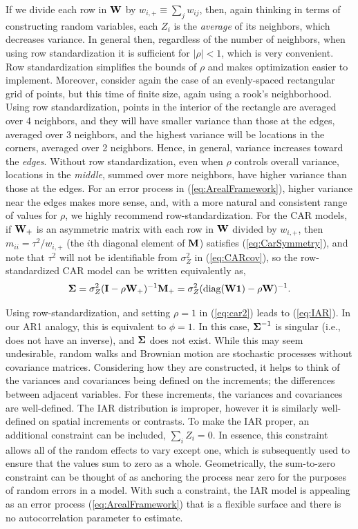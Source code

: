\documentclass[11pt, titlepage]{article}\usepackage[]{graphicx}\usepackage[]{color}
\begin{document}
If we divide each row in $\mathbf{W}$ by $w_{i,+} \equiv \sum_j w_{ij}$, then, again thinking in terms of constructing random variables, each $Z_i$ is the \textit{average} of its neighbors, which decreases variance. In general then, regardless of the number of neighbors, when using row standardization it is sufficient for $|\rho| < 1$, which is very convenient. Row standardization simplifies the bounds of $\rho$ and makes optimization easier to implement.  Moreover, consider again the case of an evenly-spaced rectangular grid of points, but this time of finite size, again using a rook's neighborhood.  Using row standardization, points in the interior of the rectangle are averaged over 4 neighbors, and they will have smaller variance than those at the edges, averaged over 3 neighbors, and the highest variance will be locations in the corners, averaged over 2 neighbors.  Hence, in general, variance increases toward the \textit{edges}.  Without row standardization, even when $\rho$ controls overall variance, locations in the \textit{middle}, summed over more neighbors, have higher variance than those at the edges.  For an error process in (\ref{eq:ArealFramework}), higher variance near the edges makes more sense, and, with a more natural and consistent range of values for $\rho$, we highly recommend row-standardization. For the CAR models, if $\mathbf{W}_+$ is an asymmetric matrix with each row in $\mathbf{W}$ divided by $w_{i,+}$, then $m_{ii} = \tau^2/w_{i,+}$ (the $i$th diagonal element of $\mathbf{M}$) satisfies (\ref{eq:CarSymmetry}), and note that $\tau^2$ will not be identifiable from $\sigma_Z^2$ in (\ref{eq:CARcov}), so the row-standardized CAR model can be written equivalently as,
\begin{equation}\label{eq:bWone}
  \mbox{\boldmath $\Sigma$} = \sigma_Z^2(\mathbf{I} - \rho\mathbf{W}_+)^{-1}\mathbf{M}_+= \sigma_Z^2(\textrm{diag}(\mathbf{W}\mathbf{1}) - \rho\mathbf{W})^{-1}.
\end{equation}

Using row-standardization, and setting $\rho = 1$ in (\ref{eq:car2}) leads to (\ref{eq:IAR}).  In our AR1 analogy, this is equivalent to $\phi = 1$.  In this case, $\mbox{\boldmath $\Sigma$}^{-1}$ is singular (i.e., does not have an inverse), and $\mbox{\boldmath $\Sigma$}$ does not exist. While this may seem undesirable, random walks and Brownian motion are stochastic processes without covariance matrices.  Considering how they are constructed, it helps to think of the variances and covariances being defined on the increments; the differences between adjacent variables.  For these increments, the variances and covariances are well-defined. The IAR distribution is improper, however it is similarly well-defined on spatial increments or contrasts. To make the IAR proper, an additional constraint can be included, $\sum_i Z_i=0$. In essence, this constraint allows all of the random effects to vary except one, which is subsequently used to ensure that the values sum to zero as a whole. Geometrically, the sum-to-zero constraint can be thought of as anchoring the process near zero for the purposes of random errors in a model. With such a constraint, the IAR model is appealing as an error process (\ref{eq:ArealFramework}) that is a flexible surface and there is no autocorrelation parameter to estimate.
\end{document}
